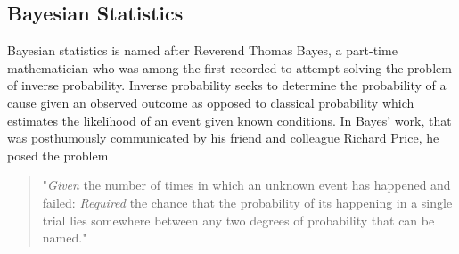 \documentclass{article}\usepackage[]{graphicx}\usepackage[]{color}
\begin{document}
\subsection{Bayesian Statistics}
\label{sec:bayes}
Bayesian statistics is named after Reverend Thomas Bayes, a part-time mathematician who was among the first recorded to attempt solving the problem of inverse probability\cite{shoemakerBayesianStatisticsGenetics1999,gelmanBayesianDataAnalysisa}. Inverse probability seeks to determine the probability of a cause given an observed outcome as opposed to classical probability which estimates the likelihood of an event given known conditions. In Bayes' work, that was posthumously communicated by his friend and colleague Richard Price, he posed the problem 
\begin{quote}
    "\textit{Given} the number of times in which an unknown event has happened and failed: 
    \textit{Required} the chance that the probability of its happening in a single trial lies 
    somewhere between any two degrees of probability that can be named." \cite{bayesLIIEssaySolving1997}
\end{quote}
\end{document}
